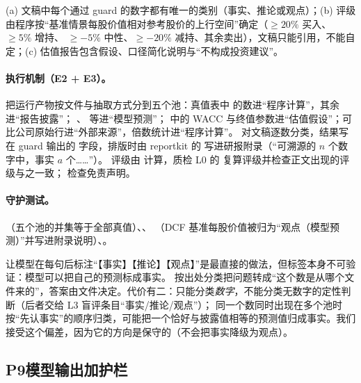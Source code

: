 \begin{invariant}[可分类与结构]\label{inv:pr-fio}
(a) 文稿中每个通过 guard 的数字都有唯一的类别（事实、推论或观点）；(b) 评级由程序按“基准情景每股价值相对参考股价的上行空间”确定（$\ge20\%$ 买入、$\ge5\%$ 增持、
$\ge-5\%$ 中性、$\ge-20\%$ 减持、其余卖出），文稿只能引用，不能自定；(c) 估值报告包含假设、口径简化说明与“不构成投资建议”。
\end{invariant}

\paragraph{执行机制（E2 + E3）。} 把运行产物按文件与抽取方式分到五个池：真值表中  的数进“程序计算”，其余进“报告披露”；
、 等进“模型预测”； 中的 WACC 与终值参数进“估值假设”；可比公司原始行进“外部来源”，倍数统计进“程序计算”。
 对文稿逐数分类，结果写在 guard 输出的  字段，排版时由 reportkit 的  写进研报附录（“可溯源的 $n$ 个数字中，事实 $a$ 个……”）。
评级由  计算，质检 L0 的  复算评级并检查正文出现的评级与之一致； 检查免责声明。

\paragraph{守护测试。}（五个池的并集等于全部真值）、、
（DCF 基准每股价值被归为“观点（模型预测）”并写进附录说明）、。

\begin{tradeoff}
让模型在每句后标注“【事实】【推论】【观点】”是最直接的做法，但标签本身不可验证：模型可以把自己的预测标成事实。
按出处分类把问题转成“这个数是从哪个文件来的”，答案由文件决定。代价有二：只能分类\emph{数字}，不能分类无数字的定性判断（后者交给 L3 盲评条目“事实/推论/观点”）；
同一个数同时出现在多个池时按“先认事实”的顺序归类，可能把一个恰好与披露值相等的预测值归成事实。我们接受这个偏差，因为它的方向是保守的（不会把事实降级为观点）。
\end{tradeoff}

\subsection{P9\quad 模型输出加护栏}
\label{sec:pr-p9}

